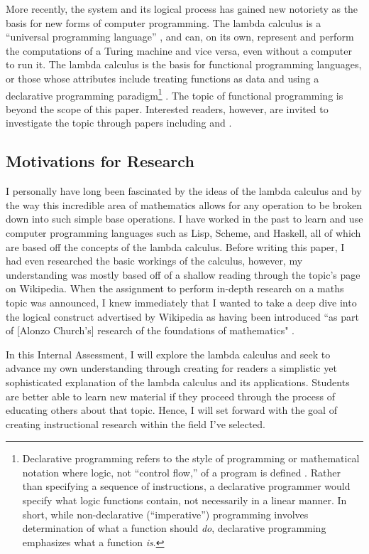 \documentclass[twocolumn,titlepage,12pt]{article}
\begin{document}
More recently, the system and its logical process has gained new notoriety as the basis for new forms of computer programming. The lambda calculus is a ``universal programming language'' \cite{rojastutorial}, and can, on its own, represent and perform the computations of a Turing machine and vice versa, even without a computer to run it. The lambda calculus is the basis for functional programming languages, or those whose attributes include treating functions as data and using a declarative programming paradigm\footnote{Declarative programming refers to the style of programming or mathematical notation where logic, not ``control flow,'' of a program is defined \cite{declarativeprogadv}. Rather than specifying a sequence of instructions, a declarative programmer would specify what logic functions contain, not necessarily in a linear manner. In short, while non-declarative (``imperative'') programming involves determination of what a function should \textit{do}, declarative programming emphasizes what a function \textit{is}.} \cite{hudakevolution}. The topic of functional programming is beyond the scope of this paper. Interested readers, however, are invited to investigate the topic through papers including \cite{totalfp} and \cite{hudakevolution}.

\subsection{Motivations for Research}
I personally have long been fascinated by the ideas of the lambda calculus and by the way this incredible area of mathematics allows for any operation to be broken down into such simple base operations. I have worked in the past to learn and use computer programming languages such as Lisp, Scheme, and Haskell, all of which are based off the concepts of the lambda calculus. Before writing this paper, I had even researched the basic workings of the calculus, however, my understanding was mostly based off of a shallow reading through the topic's page on Wikipedia. When the assignment to perform in-depth research on a maths topic was announced, I knew immediately that I wanted to take a deep dive into the logical construct advertised by Wikipedia as having been introduced ``as part of [Alonzo Church's] research of the foundations of mathematics" \cite{wikipedialc}.

In this Internal Assessment, I will explore the lambda calculus and seek to advance my own understanding through creating for readers a simplistic yet sophisticated explanation of the lambda calculus and its applications. Students are better able to learn new material if they proceed through the process of educating others about that topic. Hence, I will set forward with the goal of creating instructional research within the field I've selected.
\end{document}
